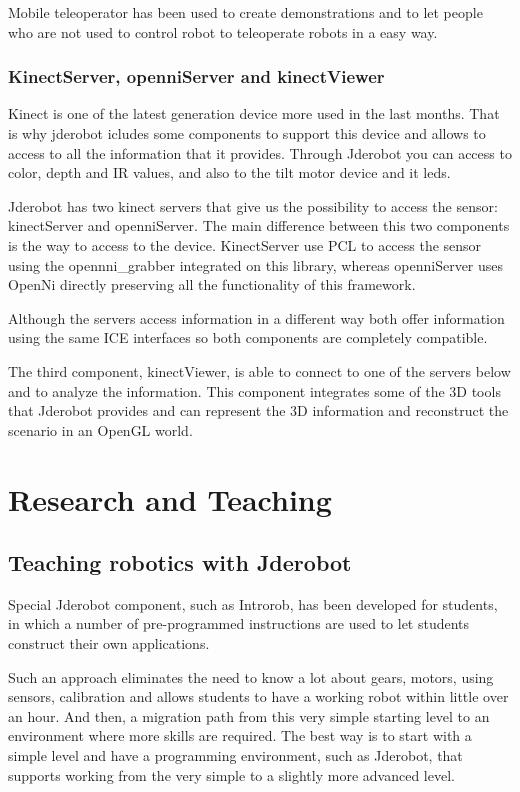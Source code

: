 \documentclass[twocolumn]{svjour3}          %
\begin{document}
Mobile teleoperator has been used to create demonstrations and to let people who are not used to control robot to teleoperate robots in a easy way.


\subsubsection{KinectServer, openniServer and kinectViewer}
Kinect is one of the latest generation device more used in the last months. That is why jderobot icludes some components to support this device and allows to access to all the information that it provides. Through Jderobot you can access to color, depth and IR values, and also to the tilt motor device and it leds.

Jderobot has two kinect servers that give us the possibility to access the sensor: kinectServer and openniServer. The main difference between this two components is the way to access to the device. KinectServer use PCL to access the sensor using the opennni\_grabber integrated on this library, whereas openniServer uses OpenNi directly preserving all the functionality of this framework. 

Although the servers access information in a different way both offer information using the same ICE interfaces so both components are completely compatible. 

The third component, kinectViewer, is able to connect to one of the servers below and to analyze  the information. This component integrates some of the 3D tools that Jderobot provides and can represent the 3D information and reconstruct the scenario in an OpenGL world. 


\section{Research and Teaching}
\label{ref:research}

\subsection{Teaching robotics with Jderobot}

Special Jderobot component, such as Introrob, has been developed for students, in which a number of pre-programmed instructions are used to let students construct their own applications.

Such an approach eliminates the need to know a lot about gears, motors, using sensors, calibration and allows students to have a working robot within little over an hour. And then, a migration path from this very simple starting level to an environment where more skills are required. The best way is to start with a simple level and have a programming environment, such as Jderobot, that supports working from the very simple to a slightly more advanced level.
\end{document}
